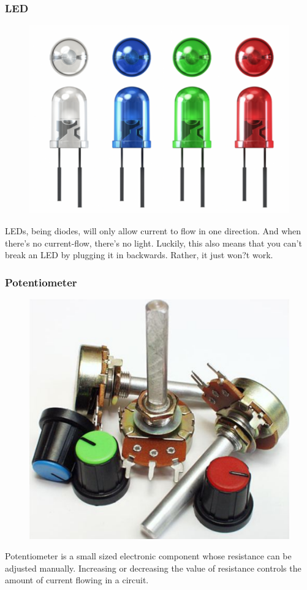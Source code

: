 \begin{frame}
	\frametitle{LED}
	\begin{figure}
   		\includegraphics[scale=.2]{assets/led} 
	\end{figure}
	LEDs, being diodes, will only allow current to flow in one direction. And when there's no current-flow, there's no light. Luckily, this also means that you can't break an LED by plugging it in backwards. Rather, it just won?t work.
\end{frame}

\begin{frame}
	\frametitle{Potentiometer}
	\begin{figure}
   		\includegraphics[scale=.2]{assets/pot} 
	\end{figure}
		Potentiometer is a small sized electronic component whose resistance can be adjusted manually. Increasing or decreasing the value of resistance controls the amount of current flowing in a circuit.
	
	
\end{frame}

